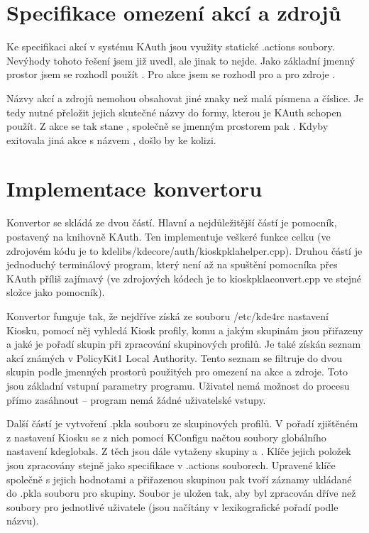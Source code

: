\section{Specifikace omezení akcí a zdrojů}
Ke specifikaci akcí v systému KAuth jsou využity statické .actions soubory. Nevýhody tohoto řešení jsem již uvedl, ale jinak to nejde. Jako základní jmenný prostor jsem se rozhodl použít . Pro akce jsem se rozhodl pro  a pro zdroje .

Názvy akcí a zdrojů nemohou obsahovat jiné znaky než malá písmena a číslice. Je tedy nutné přeložit jejich skutečné názvy do formy, kterou je KAuth schopen použít. Z akce  se tak stane , společně se jmenným prostorem pak \linebreak{}. Kdyby exitovala jiná akce s názvem  , došlo by ke kolizi.

\section{Implementace konvertoru}
Konvertor se skládá ze dvou částí. Hlavní a nejdůležitější částí je pomocník, postavený na knihovně KAuth. Ten implementuje veškeré funkce celku (ve zdrojovém kódu je to kdelibs/kdecore/auth/kioskpklahelper.cpp). Druhou částí je jednoduchý terminálový program, který není až na spuštění pomocníka přes KAuth příliš zajímavý (ve zdrojových kódech je to kioskpklaconvert.cpp ve stejné složce jako pomocník).

Konvertor funguje tak, že nejdříve získá ze souboru /etc/kde4rc nastavení Kiosku, pomocí něj vyhledá Kiosk profily, komu a jakým skupinám jsou přiřazeny a jaké je pořadí skupin při zpracování skupinových profilů. Je také získán seznam akcí známých v PolicyKit1 Local Authority. Tento seznam se filtruje do dvou skupin podle jmenných prostorů použitých pro omezení na akce a zdroje. Toto jsou základní vstupní parametry programu. Uživatel nemá možnost do procesu přímo zasáhnout -- program nemá žádné uživatelské vstupy.

Další částí je vytvoření .pkla souboru ze skupinových profilů. V pořadí zjištěném z nastavení Kiosku se z nich pomocí KConfigu načtou soubory globálního nastavení kdeglobals. Z těch jsou dále vytaženy skupiny  a . Klíče jejich položek jsou zpracovány stejně jako specifikace v .actions souborech. Upravené klíče společně s jejich hodnotami a přiřazenou skupinou pak tvoří záznamy ukládané do .pkla souboru pro skupiny. Soubor je uložen tak, aby byl zpracován dříve než soubory pro jednotlivé uživatele (jsou načítány v lexikografické pořadí podle názvu).

